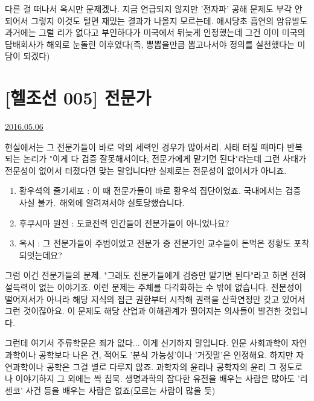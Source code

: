 다른 걸 떠나서 옥시만 문제겠나.
지금 언급되지 않지만 '전자파' 공해 문제도 부각 안 되어서 그렇지 이것도 털면 재밌는 결과가 나올지 모르는데.
애시당초 흡연의 암유발도 과거에는 그럴 리가 없다고 부인하다가 미국에서 뒤늦게 인정했는데
그건 이미 미국의 담배회사가 해외로 눈돌린 이후였다(즉, 뽕뽑을만큼 뽑고나서야 정의를 실천했다는 미담이 되겠다)
\vspace{5mm}






\section{[헬조선 005] 전문가}
\href{https://www.kockoc.com/Apoc/762604}{2016.05.06}

\vspace{5mm}

현실에서는 그 전문가들이 바로 악의 세력인 경우가 많아서리.
사태 터질 때마다 반복되는 논리가 "이게 다 검증 잘못해서이다, 전문가에게 맡기면 된다"라는데
그런 사태가 전문성이 없어서 터졌다면 맞는 말입니다만 실제로는 전문성이 없어서가 아니죠.
\vspace{5mm}
\begin{enumerate}
    \item 황우석의 줄기세포 : 이 때 전문가들이 바로 황우석 집단이었죠. 국내에서는 검증 사실 불가. 해외에 알려져서야 실토당했습니다.
    \item 후쿠시마 원전 : 도쿄전력 인간들이 전문가들이 아니었나요?
    \item 옥시 : 그 전문가들이 주범이었고 전문가 중 전문가인 교수들이 돈먹은 정황도 포착되엇는데요?
\end{enumerate}
\vspace{5mm}

그럼 이건 전문가들의 문제. "그래도 전문가들에게 검증만 맡기면 된다"라고 하면 전혀 설득력이 없는 이야기죠.
이런 문제는 주체를 다각화하는 수 밖에 없습니다.
전문성이 떨어져서가 아니라 해당 지식의 접근 권한부터 시작해 권력을 산학연정만 갖고 있어서 그런 것이잖아요.
이 문제도 해당 산업과 이해관계가 떨어지는 의사들이 발견한 것입니다.
\vspace{5mm}

그런데 여기서 주류학문은 죄가 없다... 이게 신기하지 말입니다.
인문 사회과학이 자연과학이나 공학보다 나은 건, 적어도 '분식 가능성'이나 '거짓말'은 인정해요.
하지만 자연과학이나 공학은 그걸 별로 다루지 않죠. 과학자의 윤리나 공학자의 윤리 그 정도로나 이야기하지 그 외에는 싹 침묵.
생명과학의 잡다한 유전을 배우는 사람은 많아도 '리센코' 사건 등을 배우는 사람은 없죠(모르는 사람이 많을 듯)
\vspace{5mm}

